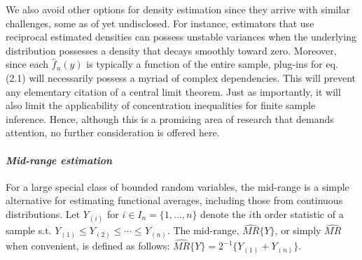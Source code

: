\documentclass[12pt]{amsart}
\theoremstyle{plain}%
\theoremstyle{definition}
\theoremstyle{remark}
\numberwithin{equation}{section}
\begin{document}
We also avoid other options for density estimation since they arrive with similar challenges, some as of yet undisclosed. For instance, estimators that use reciprocal estimated densities can possess unstable variances when the underlying distribution possesses a density that decays smoothly toward zero. Moreover, since each $\hat{f}_n (y)$ is typically a function of the entire sample, plug-ins for eq. (2.1) will necessarily possess a myriad of complex dependencies. This will prevent any elementary citation of a central limit theorem. Just as importantly, it will also limit the applicability of concentration inequalities for finite sample inference. Hence, although this is a promising area of research that demands attention, no further consideration is offered here.
\newline
\paragraph{\textit{Mid-range estimation}} For a large special class of bounded random variables, the mid-range is a simple alternative for estimating functional averages, including those from continuous distributions. Let $Y_{(i)}$ for $i \in I_n = \{1, \ldots, n \}$ denote the $i$th order statistic of a sample s.t. $Y_{(1)} \leq Y_{(2)} \leq \cdots \leq Y_{(n)}$. The mid-range, $\hat{MR}\{ Y \}$, or simply $\hat{MR}$ when convenient, is defined as follows: $\hat{MR} \{ Y \} = 2^{-1} \{ Y_{(1)} + Y_{(n)} \}$.
\end{document}
